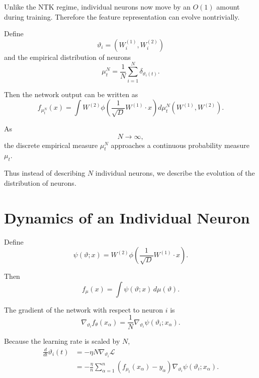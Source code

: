 Unlike the NTK regime, individual neurons now move by an \(O(1)\)
amount during training. Therefore the feature representation can evolve
nontrivially.

Define
\begin{equation}
    \vartheta_i
    =
    \left(
        W_i^{(1)},W_i^{(2)}
    \right)
\end{equation}
and the empirical distribution of neurons
\begin{equation}
    \boxed{
    \mu_t^N
    =
    \frac{1}{N}
    \sum_{i=1}^{N}
    \delta_{\vartheta_i(t)}.
    }
\end{equation}

Then the network output can be written as
\begin{equation}
    f_{\mu_t^N}(x)
    =
    \int
    W^{(2)}
    \phi\!\left(
        \frac{1}{\sqrt{D}}
        W^{(1)}\cdot x
    \right)
    d\mu_t^N(W^{(1)},W^{(2)}).
\end{equation}

As
\[
N\rightarrow\infty,
\]
the discrete empirical measure \(\mu_t^N\) approaches a continuous
probability measure \(\mu_t\).

Thus instead of describing \(N\) individual neurons, we describe the
evolution of the distribution of neurons.

\section{Dynamics of an Individual Neuron}

Define
\begin{equation}
    \psi(\vartheta;x)
    =
    W^{(2)}
    \phi\!\left(
        \frac{1}{\sqrt{D}}
        W^{(1)}\cdot x
    \right).
\end{equation}

Then
\[
f_{\mu}(x)
=
\int
\psi(\vartheta;x)
\,d\mu(\vartheta).
\]

The gradient of the network with respect to neuron \(i\) is
\begin{equation}
    \nabla_{\vartheta_i}
    f_\theta(x_\alpha)
    =
    \frac{1}{N}
    \nabla_{\vartheta_i}
    \psi(\vartheta_i;x_\alpha).
\end{equation}

Because the learning rate is scaled by \(N\),
\begin{align}
    \frac{d}{dt}
    \vartheta_i(t)
    &=
    -\eta N
    \nabla_{\vartheta_i}
    \mathcal{L}
    \\
    &=
    -\frac{\eta}{n}
    \sum_{\alpha=1}^{n}
    \left(
        f_{\mu_t}(x_\alpha)-y_\alpha
    \right)
    \nabla_{\vartheta_i}
    \psi(\vartheta_i;x_\alpha).
\end{align}

